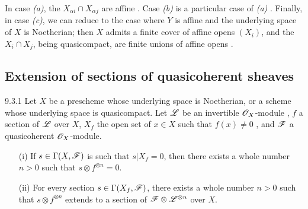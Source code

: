 \documentclass{book}
\begin{document}
In case \emph{(a)}, the $X_{\alpha i}\cap X_{\alpha j}$ are affine .
Case \emph{(b)} is a particular case of \emph{(a)} .  Finally, in case
\emph{(c)}, we can reduce to the case where $Y$ is affine and the underlying
space of $X$ is Noetherian; then $X$ admits a finite cover of affine opens
$(X_i)$, and the $X_i\cap X_j$, being quasicompact, are finite unions of affine
opens .

\subsection{Extension of sections of quasicoherent sheaves}
\label{1-schemes-9.3}       

\begin{envs}[Theorem]{9.3.1}
\label{thm-1.9.3.1}
Let $X$ be a prescheme whose underlying space is Noetherian, or a scheme whose underlying
space is quasicompact. Let $\mathscr{L}$ be an invertible $\mathscr{O}_X$-module
, $f$ a section of $\mathscr{L}$ over $X$, $X_f$ the open
set of $x\in X$ such that $f(x)\neq0$ , and $\mathscr{F}$ a
quasicoherent $\mathscr{O}_X$-module.
\begin{itemize}
  \item[(i)] If $s\in\Gamma(X,\mathscr{F})$ is such that $s|X_f=0$,
             then there exists a whole number $n>0$ such that $s\otimes f^{\otimes n}=0$.
  \item[(ii)] For every section $s\in\Gamma(X_f,\mathscr{F})$, there exists a whole number
              $n>0$ such that $s\otimes f^{\otimes n}$ extends to a section of
              $\mathscr{F}\otimes\mathscr{L}^{\otimes n}$ over $X$.
\end{itemize}
\end{envs}
\end{document}
